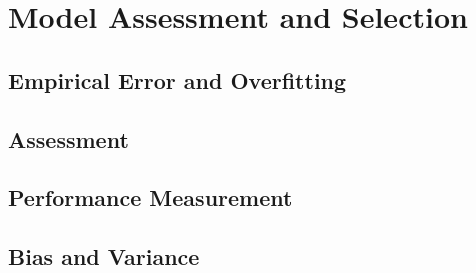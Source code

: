 \section{Model Assessment and Selection}

\subsection{Empirical Error and Overfitting}

\subsection{Assessment}

\subsection{Performance Measurement}

\subsection{Bias and Variance}
